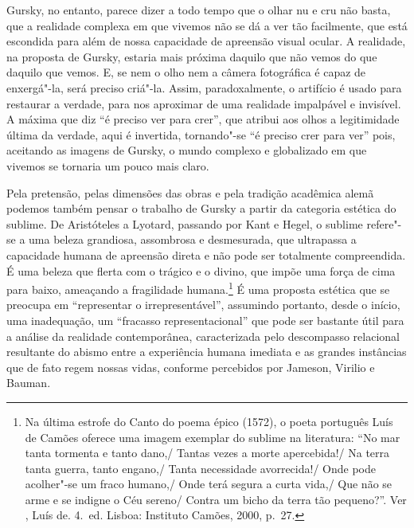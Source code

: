 Gursky, no entanto, parece dizer a todo tempo que o olhar nu e cru não
basta, que a realidade complexa em que vivemos não se dá a ver tão
facilmente, que está escondida para além de nossa capacidade de
apreensão visual ocular. A realidade, na proposta de Gursky, estaria
mais próxima daquilo que não vemos do que daquilo que vemos. E, se nem o
olho nem a câmera fotográfica é capaz de enxergá"-la, será preciso
criá"-la. Assim, paradoxalmente, o artifício é usado para restaurar a
verdade, para nos aproximar de uma realidade impalpável e invisível. A
máxima que diz ``é preciso ver para crer'', que atribui aos olhos a
legitimidade última da verdade, aqui é invertida, tornando"-se ``é
preciso crer para ver'' pois, aceitando as imagens de Gursky, o mundo
complexo e globalizado em que vivemos se tornaria um pouco mais claro.

Pela pretensão, pelas dimensões das obras e pela tradição acadêmica
alemã podemos também pensar o trabalho de Gursky a partir da categoria
estética do sublime. De Aristóteles a Lyotard, passando por Kant e
Hegel, o sublime refere"-se a uma beleza grandiosa, assombrosa e
desmesurada, que ultrapassa a capacidade humana de apreensão direta e
não pode ser totalmente compreendida. É uma beleza que flerta com o
trágico e o divino, que impõe uma força de cima para baixo, ameaçando a
fragilidade humana.\footnote{Na última estrofe do Canto  do poema épico
  {} (1572), o poeta português Luís de Camões oferece
  uma imagem exemplar do sublime na literatura:
``No mar tanta tormenta e tanto dano,/ Tantas vezes a morte apercebida!/ Na terra tanta guerra, tanto engano,/ Tanta necessidade avorrecida!/ Onde pode acolher"-se um fraco humano,/ Onde terá segura a curta vida,/ Que não se arme e se indigne o Céu sereno/ Contra um bicho da terra tão pequeno?''. Ver , Luís de. {} 4.~ed. Lisboa: Instituto Camões, 2000, p.~27.} É uma proposta estética que se preocupa em
``representar o irrepresentável'', assumindo portanto, desde o início,
uma inadequação, um ``fracasso representacional'' que pode ser bastante
útil para a análise da realidade contemporânea, caracterizada pelo
descompasso relacional resultante do abismo entre a experiência humana
imediata e as grandes instâncias que de fato regem nossas vidas,
conforme percebidos por Jameson, Virilio e Bauman.

